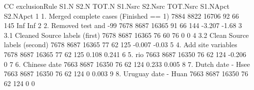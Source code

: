 \documentclass[]{article}
\newenvironment{Shaded}{\begin{snugshade}}{\end{snugshade}}
\newcommand{\KeywordTok}[1]{\textcolor[rgb]{0.94,0.87,0.69}{{#1}}}
\newcommand{\DecValTok}[1]{\textcolor[rgb]{0.86,0.86,0.80}{{#1}}}
\newcommand{\FloatTok}[1]{\textcolor[rgb]{0.75,0.75,0.82}{{#1}}}
\newcommand{\StringTok}[1]{\textcolor[rgb]{0.80,0.58,0.58}{{#1}}}
\newcommand{\OtherTok}[1]{\textcolor[rgb]{0.94,0.94,0.56}{{#1}}}
\newcommand{\NormalTok}[1]{\textcolor[rgb]{0.80,0.80,0.80}{{#1}}}
\begin{document}
\begin{Shaded}
\begin{Highlighting}[]
\NormalTok{CC}
                                \NormalTok{exclusionRule S1.N S2.N TOT.N S1.Nsrc S2.Nsrc TOT.Nsrc S1.NApct S2.NApct}
\DecValTok{1}    \DecValTok{1}\NormalTok{. Merged complete }\KeywordTok{cases} \NormalTok{(Finished ==}\StringTok{ }\DecValTok{1}\NormalTok{) }\DecValTok{7884} \DecValTok{8822} \DecValTok{16706}      \DecValTok{92}      \DecValTok{66}      \DecValTok{145}      \OtherTok{Inf}      \OtherTok{Inf}
\DecValTok{2}                     \DecValTok{2}\NormalTok{. Removed test and -}\DecValTok{99} \DecValTok{7678} \DecValTok{8687} \DecValTok{16365}      \DecValTok{91}      \DecValTok{66}      \DecValTok{144}   \NormalTok{-}\FloatTok{3.207}    \NormalTok{-}\FloatTok{1.68}
\DecValTok{3}           \FloatTok{3.1} \NormalTok{Cleaned Source }\KeywordTok{labels} \NormalTok{(first) }\DecValTok{7678} \DecValTok{8687} \DecValTok{16365}      \DecValTok{76}      \DecValTok{60}       \DecValTok{76}        \DecValTok{0}        \DecValTok{0}
\DecValTok{4}            \FloatTok{3.2} \NormalTok{Clean Source }\KeywordTok{labels} \NormalTok{(second) }\DecValTok{7678} \DecValTok{8687} \DecValTok{16365}      \DecValTok{77}      \DecValTok{62}      \DecValTok{125}   \NormalTok{-}\FloatTok{0.007}    \NormalTok{-}\FloatTok{0.03}
\DecValTok{5}                       \DecValTok{4}\NormalTok{. Add site variables }\DecValTok{7678} \DecValTok{8687} \DecValTok{16365}      \DecValTok{77}      \DecValTok{62}      \DecValTok{125}    \FloatTok{0.108}    \FloatTok{0.241}
\DecValTok{6}                                      \DecValTok{5}\NormalTok{. rio }\DecValTok{7663} \DecValTok{8687} \DecValTok{16350}      \DecValTok{76}      \DecValTok{62}      \DecValTok{124}   \NormalTok{-}\FloatTok{0.206}        \DecValTok{0}
\DecValTok{7}                             \DecValTok{6}\NormalTok{. Chinese date }\DecValTok{7663} \DecValTok{8687} \DecValTok{16350}      \DecValTok{76}      \DecValTok{62}      \DecValTok{124}    \FloatTok{0.233}    \FloatTok{0.005}
\DecValTok{8}                        \DecValTok{7}\NormalTok{. Dutch date -}\StringTok{ }\NormalTok{Hsee }\DecValTok{7663} \DecValTok{8687} \DecValTok{16350}      \DecValTok{76}      \DecValTok{62}      \DecValTok{124}        \DecValTok{0}    \FloatTok{0.003}
\DecValTok{9}                      \DecValTok{8}\NormalTok{. Uruguay date -}\StringTok{ }\NormalTok{Huan }\DecValTok{7663} \DecValTok{8687} \DecValTok{16350}      \DecValTok{76}      \DecValTok{62}      \DecValTok{124}        \DecValTok{0}        \DecValTok{0}

\end{Highlighting}
\end{Shaded}
\end{document}
